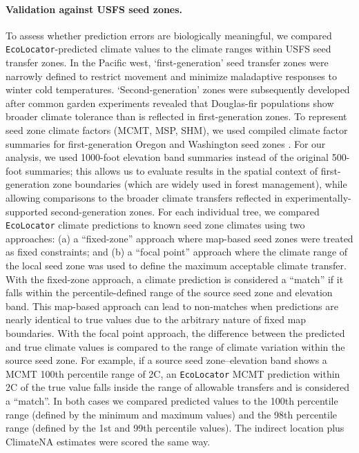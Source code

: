 \documentclass[]{article}
\newcommand{\dfir}{Douglas-fir\xspace}
\newcommand{\ecolocator}{\texttt{EcoLocator}\xspace}
\begin{document}

\paragraph{Validation against USFS seed zones.}
To assess whether prediction errors are biologically meaningful,
we compared \ecolocator-predicted climate values to the climate ranges
within USFS seed transfer zones. In the Pacific west, `first-generation'
seed transfer zones \citep{usdaforestservice_tree_1973} were narrowly
defined to restrict movement and minimize maladaptive responses to winter
cold temperatures. `Second-generation' zones \citep{randall_forest_1996, randall_washington_2002}
were subsequently developed after common garden experiments revealed that
\dfir populations show broader climate tolerance than is reflected in first-generation zones.
To represent seed zone climate factors (MCMT, MSP, SHM), we used compiled climate factor summaries for 
first-generation Oregon and Washington seed zones \citep{shalev_zone_2026}.
For our analysis, we used 1000-foot elevation band summaries instead of the original 
500-foot summaries; this allows us to evaluate results in the spatial context of first-generation 
zone boundaries (which are widely used in forest management), 
while allowing comparisons to the broader climate 
transfers reflected in experimentally-supported second-generation zones.
For each individual tree, we compared \ecolocator climate predictions to known seed zone climates
using two approaches:
(a) a ``fixed-zone'' approach where map-based seed zones were treated as fixed constraints; and
(b) a ``focal point'' approach where the climate range of the local seed zone was used
to define the maximum acceptable climate transfer.
With the fixed-zone approach, a climate prediction is considered a ``match'' if it falls within
the percentile-defined range of the source seed zone and elevation band. This map-based
approach can lead to non-matches when predictions are nearly identical to true values
due to the arbitrary nature of fixed map boundaries.
With the focal point approach, the difference between the predicted
and true climate values is compared to the range of climate variation within the source seed
zone. For example, if a source seed zone--elevation band shows a
MCMT 100th percentile range of 2\textdegree{}C, an \ecolocator MCMT prediction
within 2\textdegree{}C of the true value falls inside the range of allowable transfers
and is considered a ``match''.
In both cases we compared predicted values to the 100th percentile range
(defined by the minimum and maximum values)
and the 98th percentile range (defined by the 1st and 99th percentile values).
The indirect location plus ClimateNA estimates were scored the same way.
\end{document}
